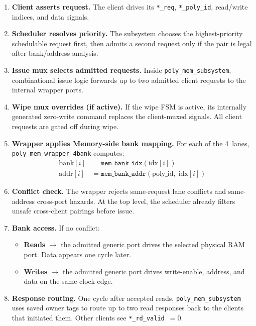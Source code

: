 \documentclass[11pt,letterpaper]{article}
\begin{document}
\begin{enumerate}
  \item \textbf{Client asserts request.} The client drives its
    \texttt{*\_req}, \texttt{*\_poly\_id}, read/write indices, and data
    signals.

  \item \textbf{Scheduler resolves priority.} The subsystem chooses the
    highest-priority schedulable request first, then admits a second
    request only if the pair is legal after bank/address analysis.

  \item \textbf{Issue mux selects admitted requests.} Inside
    \texttt{poly\_mem\_subsystem}, combinational issue logic forwards up
    to two admitted client requests to the internal wrapper ports.

  \item \textbf{Wipe mux overrides (if active).} If the wipe FSM is
    active, its internally generated zero-write command replaces the
    client-muxed signals. All client requests are gated off during wipe.

  \item \textbf{Wrapper applies Memory-side bank mapping.} For each of the 4~lanes,
    \texttt{poly\_mem\_wrapper\_4bank} computes:
    \begin{align*}
      \text{bank}[i] &= \texttt{mem\_bank\_idx}(\text{idx}[i]) \\
      \text{addr}[i] &= \texttt{mem\_bank\_addr}(\text{poly\_id},\;\text{idx}[i])
    \end{align*}

  \item \textbf{Conflict check.} The wrapper rejects same-request lane
    conflicts and same-address cross-port hazards. At the top level, the
    scheduler already filters unsafe cross-client pairings before issue.

  \item \textbf{Bank access.} If no conflict:
    \begin{itemize}
      \item \textbf{Reads} $\to$ the admitted generic port drives the
        selected physical RAM port. Data appears one cycle later.
      \item \textbf{Writes} $\to$ the admitted generic port drives
        write-enable, address, and data on the same clock edge.
    \end{itemize}

  \item \textbf{Response routing.} One cycle after accepted reads,
    \texttt{poly\_mem\_subsystem} uses saved owner tags to route up to
    two read responses back to the clients that initiated them. Other
    clients see \texttt{*\_rd\_valid}~$= 0$.
\end{enumerate}
\end{document}
